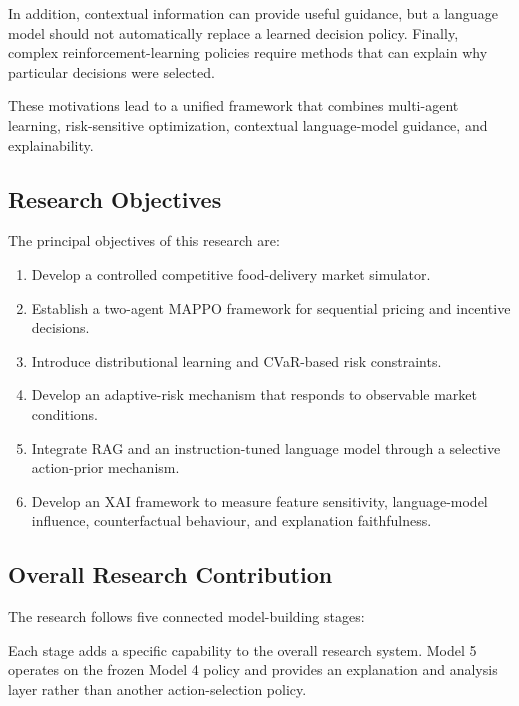 \documentclass[conference]{IEEEtran}
\begin{document}
In addition, contextual information can provide useful guidance, but a language model should not automatically replace a learned decision policy. Finally, complex reinforcement-learning policies require methods that can explain why particular decisions were selected.

These motivations lead to a unified framework that combines multi-agent learning, risk-sensitive optimization, contextual language-model guidance, and explainability.

\subsection{Research Objectives}
The principal objectives of this research are:
\begin{enumerate}
  \item Develop a controlled competitive food-delivery market simulator.
  \item Establish a two-agent MAPPO framework for sequential pricing and incentive decisions.
  \item Introduce distributional learning and CVaR-based risk constraints.
  \item Develop an adaptive-risk mechanism that responds to observable market conditions.
  \item Integrate RAG and an instruction-tuned language model through a selective action-prior mechanism.
  \item Develop an XAI framework to measure feature sensitivity, language-model influence, counterfactual behaviour, and explanation faithfulness.
\end{enumerate}

\subsection{Overall Research Contribution}
The research follows five connected model-building stages:
\begin{center}
\end{center}
Each stage adds a specific capability to the overall research system. Model 5 operates on the frozen Model 4 policy and provides an explanation and analysis layer rather than another action-selection policy.
\end{document}
